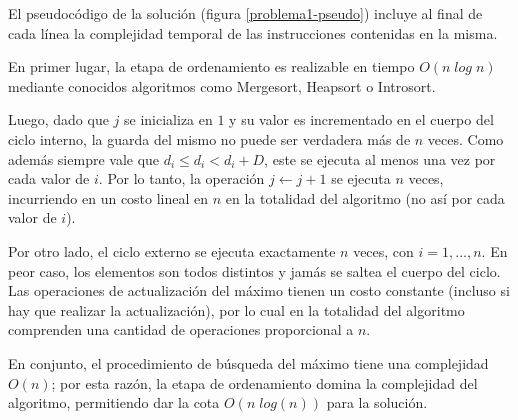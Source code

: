 El pseudocódigo de la solución (figura \ref{problema1-pseudo}) incluye al final de cada línea la complejidad temporal de las instrucciones contenidas en la misma.

En primer lugar, la etapa de ordenamiento es realizable en tiempo $O(n\;log\;n)$ mediante conocidos algoritmos como Mergesort, Heapsort o Introsort.

Luego, dado que $j$ se inicializa en $1$ y su valor es incrementado en el cuerpo del ciclo interno, la guarda del mismo no puede ser verdadera más de $n$ veces. Como además siempre vale que $d_i \leq d_i < d_i + D$, este se ejecuta al menos una vez por cada valor de $i$. Por lo tanto, la operación $j \leftarrow j + 1$ se ejecuta $n$ veces, incurriendo en un costo lineal en $n$ en la totalidad del algoritmo (no así por cada valor de $i$).

Por otro lado, el ciclo externo se ejecuta exactamente $n$ veces, con $i = 1, ..., n$. En peor caso, los elementos son todos distintos y jamás se saltea el cuerpo del ciclo. Las operaciones de actualización del máximo tienen un costo constante (incluso si hay que realizar la actualización), por lo cual en la totalidad del algoritmo comprenden una cantidad de operaciones proporcional a $n$.

En conjunto, el procedimiento de búsqueda del máximo tiene una complejidad $O(n)$; por esta razón, la etapa de ordenamiento domina la complejidad del algoritmo, permitiendo dar la cota $O(n\;log(n))$ para la solución.